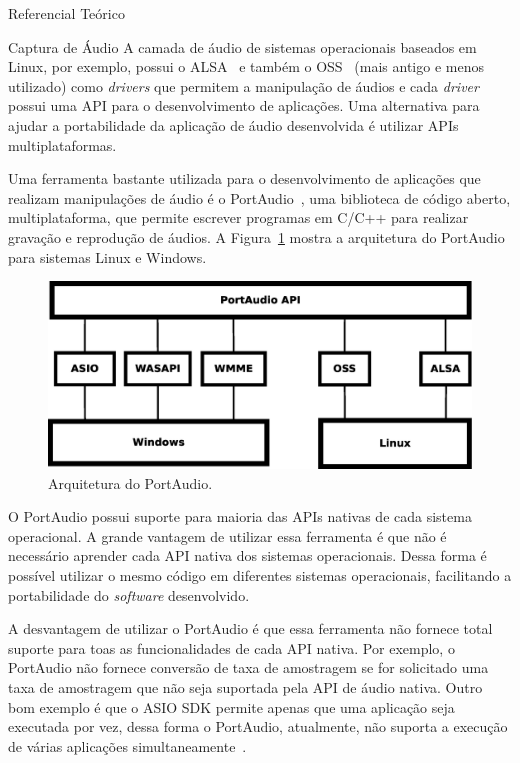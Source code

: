 \begin{chapter}{Referencial Teórico}
\begin{section}{Captura de Áudio}
A camada de áudio de sistemas operacionais baseados em Linux, por
exemplo, possui o ALSA~\cite{alsa} e também o OSS~\cite{oss} (mais antigo e
menos utilizado) como
\textit{drivers} que permitem a manipulação de áudios e cada \textit{driver}
possui uma API para o desenvolvimento de aplicações. Uma alternativa para ajudar
a portabilidade da aplicação de áudio desenvolvida é utilizar APIs
multiplataformas.

Uma ferramenta bastante utilizada para o desenvolvimento de aplicações que
realizam manipulações de áudio é o PortAudio~\cite{portaudio}, uma biblioteca de
código aberto, multiplataforma, que permite escrever programas em C/C++ para
realizar gravação e reprodução de áudios. A Figura~\ref{fig:portaudio} mostra a
arquitetura do PortAudio para sistemas Linux e Windows.

\begin{figure}[!h]
	\centering
	\begin{minipage}[c]{\textwidth}
	\centering
	\includegraphics[width=0.7\linewidth]{fig/portaudio}
	\caption{Arquitetura do PortAudio.}
	\label{fig:portaudio}
	\end{minipage}
\end{figure} 

O PortAudio possui suporte para maioria das APIs nativas de cada sistema
operacional. A grande vantagem de utilizar essa ferramenta é que não é
necessário aprender cada API nativa dos sistemas operacionais. Dessa forma é
possível utilizar o mesmo código em diferentes sistemas operacionais,
facilitando a portabilidade do \textit{software} desenvolvido.

A desvantagem de utilizar o PortAudio é que essa ferramenta não fornece total
suporte para toas as funcionalidades de cada API nativa. Por exemplo, o PortAudio não
fornece conversão de taxa de amostragem se for solicitado uma taxa de amostragem
que não seja suportada pela API de áudio nativa. Outro bom exemplo é que o ASIO
SDK permite apenas que uma aplicação seja executada por vez, dessa forma o
PortAudio, atualmente, não suporta a execução de várias aplicações
simultaneamente~\cite{portaudio}.


\end{section}
\end{chapter}
